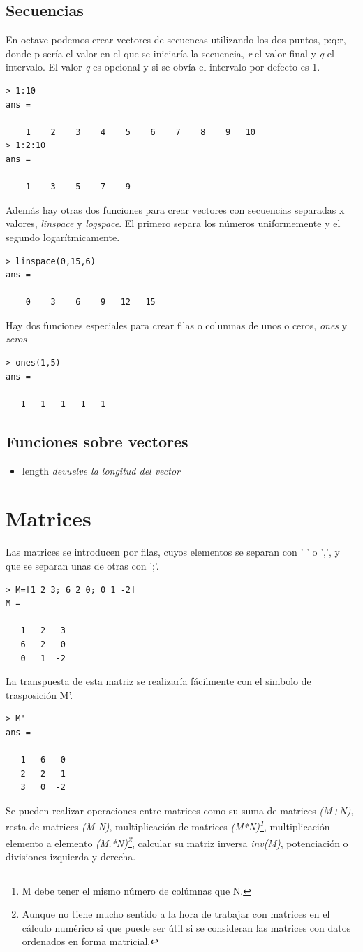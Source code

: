 \documentclass[a4,12pt,graphicx,caption,rotating]{article}
\begin{document}
\subsection{Secuencias}
En octave podemos crear vectores de secuencas utilizando los dos puntos, p:q:r, donde p sería el valor en el que se iniciaría la secuencia, \emph{r} el valor final y \emph{q} el intervalo. El valor \emph{q} es opcional y si se obvía el intervalo por defecto es 1.
\begin{verbatim}
> 1:10
ans =

    1    2    3    4    5    6    7    8    9   10
> 1:2:10
ans =

    1    3    5    7    9
\end{verbatim}
Además hay otras dos funciones para crear vectores con secuencias separadas x valores, \emph{linspace} y \emph{logspace}. El primero separa los números uniformemente y el segundo logarítmicamente.
\begin{verbatim}
> linspace(0,15,6)
ans =

    0    3    6    9   12   15
\end{verbatim}
Hay dos funciones especiales para crear filas o columnas de unos o ceros, \emph{ones} y \emph{zeros}
\begin{verbatim}
> ones(1,5)
ans =

   1   1   1   1   1
\end{verbatim}
\subsection{Funciones sobre vectores}
\begin{itemize}
\item length \emph{devuelve la longitud del vector}
\end{itemize}
\section{Matrices}
Las matrices se introducen por filas, cuyos elementos se separan con ' ' o ',', y que se separan unas de otras con ';'.
\begin{verbatim}> M=[1 2 3; 6 2 0; 0 1 -2]
M =

   1   2   3
   6   2   0
   0   1  -2
\end{verbatim}
La transpuesta de esta matriz se realizaría fácilmente con el simbolo de trasposición M'.
\begin{verbatim}
> M'
ans =

   1   6   0
   2   2   1
   3   0  -2
\end{verbatim}
Se pueden realizar operaciones entre matrices como su suma de matrices \emph{(M+N)}, resta de matrices \emph{(M-N)}, multiplicación de matrices \emph{(M*N)\footnote{M debe tener el mismo número de colúmnas que N.}}, multiplicación elemento a elemento \emph{(M.*N)\footnote{Aunque no tiene mucho sentido a la hora de trabajar con matrices en el cálculo numérico si que puede ser útil si se consideran las matrices con datos ordenados en forma matricial.}}, calcular su matriz inversa \emph{inv(M)}, potenciación o divisiones izquierda y derecha.
\end{document}
